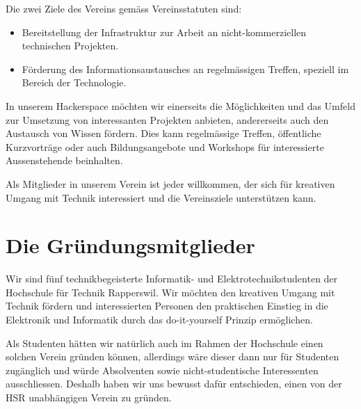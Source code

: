 \documentclass[10pt,a4paper,parskip,fleqn]{scrartcl}
\begin{document}
Die zwei Ziele des Vereins gemäss Vereinsstatuten sind:

\begin{itemize}
		\item Bereitstellung der Infrastruktur zur Arbeit an nicht-kommerziellen
			technischen Projekten.
		\item Förderung des Informationsaustausches an regelmässigen Treffen,
			speziell im Bereich der Technologie.
\end{itemize}

In unserem Hackerspace möchten wir einerseits die Möglichkeiten und das Umfeld
zur Umsetzung von interessanten Projekten anbieten, andererseits auch den
Austausch von Wissen fördern. Dies kann regelmässige Treffen, öffentliche
Kurzvorträge oder auch Bildungsangebote und Workshops für interessierte
Aussenstehende beinhalten.

Als Mitglieder in unserem Verein ist jeder willkommen, der sich für kreativen
Umgang mit Technik interessiert und die Vereinsziele unterstützen kann.


\section{Die Gründungsmitglieder}

Wir sind fünf technikbegeisterte Informatik- und Elektrotechnikstudenten der
Hochschule für Technik Rapperswil. Wir möchten den kreativen Umgang mit Technik
fördern und interessierten Personen den praktischen Einstieg in die Elektronik
und Informatik durch das do-it-yourself Prinzip ermöglichen.

Als Studenten hätten wir natürlich auch im Rahmen der Hochschule einen solchen
Verein gründen können, allerdings wäre dieser dann nur für Studenten zugänglich
und würde Absolventen sowie nicht-studentische Interessenten ausschliessen.
Deshalb haben wir uns bewusst dafür entschieden, einen von der HSR unabhängigen
Verein zu gründen.
\end{document}
